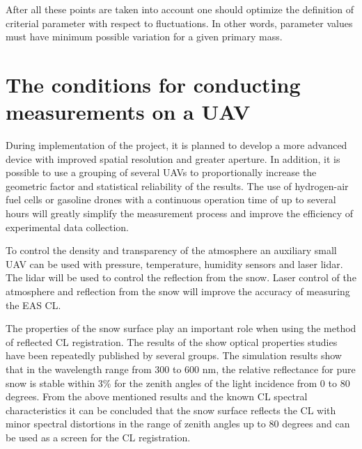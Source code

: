 \documentclass[a4paper,11pt]{article}
\begin{document}
After all these points are taken into account one should optimize the definition of criterial parameter with respect to fluctuations. In other words, parameter values must have minimum possible variation for a given primary mass.



\section{The conditions for conducting measurements on a UAV}

During implementation of the project, it is planned to develop a more advanced device with improved spatial resolution and greater aperture. 
In addition, it is possible to use a grouping of several UAVs to proportionally increase the geometric factor and statistical reliability of the results. 
The use of hydrogen-air fuel cells or gasoline drones with a continuous operation time of up to several hours will greatly simplify the measurement process and improve the efficiency of experimental data collection.

To control the density and transparency of the atmosphere an auxiliary small UAV can be used with pressure, temperature, humidity sensors and laser lidar. The lidar will be used to control the reflection from the snow. Laser control of the atmosphere and reflection from the snow will improve the accuracy of measuring the EAS CL.

The properties of the snow surface play an important role when using the method of reflected CL registration. The results of the show optical properties studies have been repeatedly published by several groups. The simulation results show that in the wavelength range from 300 to 600 nm, the relative reflectance for pure snow is stable within 3\% for the zenith angles of the light incidence from 0 to 80 degrees. From the above mentioned results and the known CL spectral characteristics it can be concluded that the snow surface reflects the CL with minor spectral distortions in the range of zenith angles up to 80 degrees and can be used as a screen for the CL registration.




\end{document}
